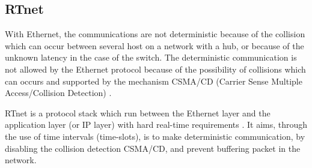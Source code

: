 \documentclass[conference]{IEEEtran}
\begin{document}
\subsection{RTnet}\label{subsec:rtnet}

With Ethernet, the communications are not deterministic because of the collision which can occur between several host on a network with a hub, or because of the unknown latency in the case of the switch. The deterministic communication is not allowed by the Ethernet protocol because of the possibility of collisions which can occurs and supported by the mechanism CSMA/CD (Carrier Sense Multiple Access/Collision Detection) \cite{rtnet_IEEE_so53551}.

RTnet is a protocol stack which run between the Ethernet layer and the application layer (or IP layer) with hard real-time requirements \cite{rtnet_org}. It aims, through the use of time intervals (time-slots), is to make deterministic communication, by disabling the collision detection CSMA/CD, and prevent buffering packet in the network. 


\end{document}
